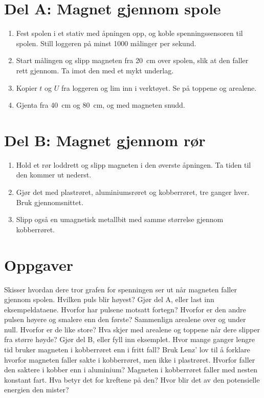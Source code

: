 \documentclass[11pt]{article}
\begin{document}
\section*{Del A: Magnet gjennom spole}

\begin{enumerate}
\item Fest spolen i et stativ med åpningen opp, og koble spenningssensoren til spolen. Still loggeren på minst 1000 målinger per sekund.
\item Start målingen og slipp magneten fra 20~cm over spolen, slik at den faller rett gjennom. Ta imot den med et mykt underlag.
\item Kopier $t$ og $U$ fra loggeren og lim inn i verktøyet. Se på toppene og arealene.
\item Gjenta fra 40~cm og 80~cm, og med magneten snudd.
\end{enumerate}

\section*{Del B: Magnet gjennom rør}

\begin{enumerate}
\item Hold et rør loddrett og slipp magneten i den øverste åpningen. Ta tiden til den kommer ut nederst.
\item Gjør det med plastrøret, aluminiumsrøret og kobberrøret, tre ganger hver. Bruk gjennomsnittet.
\item Slipp også en umagnetisk metallbit med samme størrelse gjennom kobberrøret.
\end{enumerate}

\section*{Oppgaver}

\begin{oppgaveliste}
\oppgave {}Skisser hvordan dere tror grafen for spenningen ser ut når magneten faller gjennom spolen. Hvilken puls blir høyest?
\svar
\oppgave {}Gjør del A, eller last inn eksempeldataene. Hvorfor har pulsene motsatt fortegn? Hvorfor er den andre pulsen høyere og smalere enn den første?
\svar
\oppgave {}Sammenlign arealene over og under null. Hvorfor er de like store? Hva skjer med arealene og toppene når dere slipper fra større høyde?
\svar
\oppgave {}Gjør del B, eller fyll inn eksemplet. Hvor mange ganger lengre tid bruker magneten i kobberrøret enn i fritt fall?
\svar
\oppgave {}Bruk Lenz' lov til å forklare hvorfor magneten faller sakte i kobberrøret, men ikke i plastrøret. Hvorfor faller den saktere i kobber enn i aluminium?
\svar
\oppgave {}Magneten i kobberrøret faller med nesten konstant fart. Hva betyr det for kreftene på den? Hvor blir det av den potensielle energien den mister?
\svar
\end{oppgaveliste}
\end{document}
